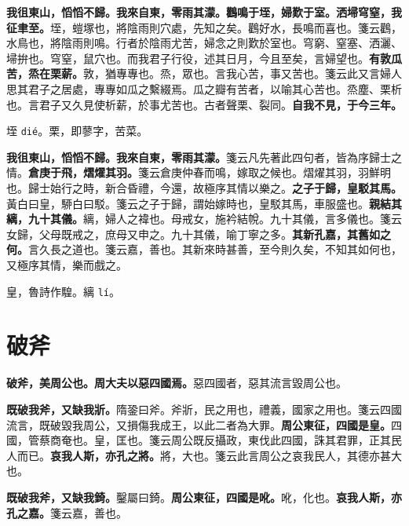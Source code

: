\textbf{我徂東山，慆慆不歸。我來自東，零雨其濛。鸛鳴于垤，婦歎于室。洒埽穹窒，我征聿至。}{\footnotesize 垤，螘塚也，將陰雨則穴處，先知之矣。鸛好水，長鳴而喜也。箋云鸛，水鳥也，將陰雨則鳴。行者於陰雨尤苦，婦念之則歎於室也。穹窮、窒塞、洒灑、埽拚也。穹窒，鼠穴也。而我君子行役，述其日月，今且至矣，言婦望也。}\textbf{有敦瓜苦，烝在栗薪。}{\footnotesize 敦，猶專專也。烝，眾也。言我心苦，事又苦也。箋云此又言婦人思其君子之居處，專專如瓜之繫綴焉。瓜之瓣有苦者，以喻其心苦也。烝塵、栗析也。言君子又久見使析薪，於事尤苦也。古者聲栗、裂同。}\textbf{自我不見，于今三年。}

\begin{quoting}垤 \texttt{dié}。栗，即蓼字，苦菜。\end{quoting}

\textbf{我徂東山，慆慆不歸。我來自東，零雨其濛。}{\footnotesize 箋云凡先著此四句者，皆為序歸士之情。}\textbf{倉庚于飛，熠燿其羽。}{\footnotesize 箋云倉庚仲春而鳴，嫁取之候也。熠燿其羽，羽鮮明也。歸士始行之時，新合昏禮，今還，故極序其情以樂之。}\textbf{之子于歸，皇駁其馬。}{\footnotesize 黃白曰皇，駵白曰駁。箋云之子于歸，謂始嫁時也，皇駁其馬，車服盛也。}\textbf{親結其縭，九十其儀。}{\footnotesize 縭，婦人之褘也。母戒女，施衿結帨。九十其儀，言多儀也。箋云女歸，父母既戒之，庶母又申之。九十其儀，喻丁寧之多。}\textbf{其新孔嘉，其舊如之何。}{\footnotesize 言久長之道也。箋云嘉，善也。其新來時甚善，至今則久矣，不知其如何也，又極序其情，樂而戲之。}

\begin{quoting}皇，魯詩作騜。縭 \texttt{lí}。\end{quoting}

\section{破斧}


\textbf{破斧，美周公也。周大夫以惡四國焉。}{\footnotesize 惡四國者，惡其流言毀周公也。}

\textbf{既破我斧，又缺我斨。}{\footnotesize 隋銎曰斧。斧斨，民之用也，禮義，國家之用也。箋云四國流言，既破毀我周公，又損傷我成王，以此二者為大罪。}\textbf{周公東征，四國是皇。}{\footnotesize 四國，管蔡商奄也。皇，匡也。箋云周公既反攝政，東伐此四國，誅其君罪，正其民人而已。}\textbf{哀我人斯，亦孔之將。}{\footnotesize 將，大也。箋云此言周公之哀我民人，其德亦甚大也。}

\textbf{既破我斧，又缺我錡。}{\footnotesize 鑿屬曰錡。}\textbf{周公東征，四國是吪。}{\footnotesize 吪，化也。}\textbf{哀我人斯，亦孔之嘉。}{\footnotesize 箋云嘉，善也。}

